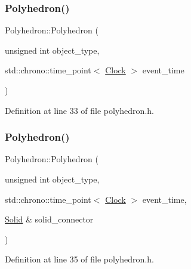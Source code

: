 \mbox{\label{class_polyhedron_a29a4fff595cdb6a557e5f62255e61192}} 
\subsubsection{\texorpdfstring{Polyhedron()}{Polyhedron()}\hspace{0.1cm}{\footnotesize\ttfamily [3/4]}}
{\footnotesize\ttfamily Polyhedron\+::\+Polyhedron (\begin{DoxyParamCaption}\item[{unsigned int}]{object\+\_\+type,  }\item[{std\+::chrono\+::time\+\_\+point$<$ \mbox{\hyperlink{universe_8h_a0ef8d951d1ca5ab3cfaf7ab4c7a6fd80}{Clock}} $>$}]{event\+\_\+time }\end{DoxyParamCaption})\hspace{0.3cm}{\ttfamily [inline]}}



Definition at line 33 of file polyhedron.\+h.

\mbox{\label{class_polyhedron_af5bb1d2a6b04502dfdbfc9f04aafc950}} 
\subsubsection{\texorpdfstring{Polyhedron()}{Polyhedron()}\hspace{0.1cm}{\footnotesize\ttfamily [4/4]}}
{\footnotesize\ttfamily Polyhedron\+::\+Polyhedron (\begin{DoxyParamCaption}\item[{unsigned int}]{object\+\_\+type,  }\item[{std\+::chrono\+::time\+\_\+point$<$ \mbox{\hyperlink{universe_8h_a0ef8d951d1ca5ab3cfaf7ab4c7a6fd80}{Clock}} $>$}]{event\+\_\+time,  }\item[{\mbox{\hyperlink{class_solid}{Solid}} \&}]{solid\+\_\+connector }\end{DoxyParamCaption})\hspace{0.3cm}{\ttfamily [inline]}}



Definition at line 35 of file polyhedron.\+h.

